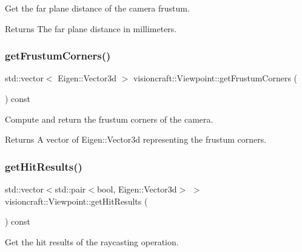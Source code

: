 Get the far plane distance of the camera frustum. 

\begin{DoxyReturn}{Returns}
The far plane distance in millimeters. 
\end{DoxyReturn}
\mbox{\label{classvisioncraft_1_1Viewpoint_a132ae1cc1c72958cb1d0c44aade4da9c}} 
\subsubsection{\texorpdfstring{get\+Frustum\+Corners()}{getFrustumCorners()}}
{\footnotesize\ttfamily std\+::vector$<$ Eigen\+::\+Vector3d $>$ visioncraft\+::\+Viewpoint\+::get\+Frustum\+Corners (\begin{DoxyParamCaption}{ }\end{DoxyParamCaption}) const}



Compute and return the frustum corners of the camera. 

\begin{DoxyReturn}{Returns}
A vector of Eigen\+::\+Vector3d representing the frustum corners. 
\end{DoxyReturn}
\mbox{\label{classvisioncraft_1_1Viewpoint_a06ee41338f5dbe482fd4ad7dab244b85}} 
\subsubsection{\texorpdfstring{get\+Hit\+Results()}{getHitResults()}}
{\footnotesize\ttfamily std\+::vector$<$std\+::pair$<$bool, Eigen\+::\+Vector3d$>$ $>$ visioncraft\+::\+Viewpoint\+::get\+Hit\+Results (\begin{DoxyParamCaption}{ }\end{DoxyParamCaption}) const\hspace{0.3cm}{\ttfamily [inline]}}



Get the hit results of the raycasting operation. 

